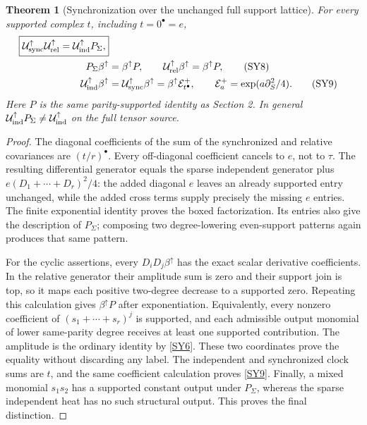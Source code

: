 \documentclass[11pt,a4paper]{article}
\newtheorem{theorem}{Theorem}[section]
\theoremstyle{definition}\newtheorem{definition}[theorem]{Definition}
\begin{document}
\begin{theorem}[Synchronization over the unchanged full support lattice]
For every supported complex $t$, including $t=0^\bullet=e$,
\begin{align}
 \boxed{\mathcal U_{\rm sync}^{\uparrow}
            \mathcal U_{\rm rel}^{\uparrow}
        =\mathcal U_{\rm ind}^{\uparrow}P_\Sigma,}\notag\\
 P_\Sigma\beta^\uparrow&=\beta^\uparrow P,\qquad
 \mathcal U_{\rm rel}^{\uparrow}\beta^\uparrow=\beta^\uparrow P,
                                                               \tag{SY8}\label{SY8}\\
 \mathcal U_{\rm ind}^{\uparrow}\beta^\uparrow
 &=\mathcal U_{\rm sync}^{\uparrow}\beta^\uparrow
 =\beta^\uparrow\mathcal E^+_{t^\bullet},
 \qquad \mathcal E^+_a=\exp(a\partial_S^2/4).                 \tag{SY9}\label{SY9}
\end{align}
Here $P$ is the same parity-supported identity as Section 2. In general
$\mathcal U_{\rm ind}^{\uparrow}P_\Sigma\ne
\mathcal U_{\rm ind}^{\uparrow}$ on the full tensor source.
\end{theorem}
\begin{proof}
The diagonal coefficients of the sum of the synchronized and relative covariances are $(t/r)^\bullet$. Every off-diagonal coefficient cancels to $e$, not to $\tau$. The resulting differential generator equals the sparse independent generator plus $e(D_1+\cdots+D_r)^2/4$: the added diagonal $e$ leaves an already supported entry unchanged, while the added cross terms supply precisely the missing $e$ entries. The finite exponential identity proves the boxed factorization. Its entries also give the description of $P_\Sigma$; composing two degree-lowering even-support patterns again produces that same pattern.

For the cyclic assertions, every $D_iD_j\beta^\uparrow$ has the exact scalar derivative coefficients. In the relative generator their amplitude sum is zero and their support join is top, so it maps each positive two-degree decrease to a supported zero. Repeating this calculation gives $\beta^\uparrow P$ after exponentiation. Equivalently, every nonzero coefficient of $(s_1+\cdots+s_r)^j$ is supported, and each admissible output monomial of lower same-parity degree receives at least one supported contribution. The amplitude is the ordinary identity by \eqref{SY6}. These two coordinates prove the equality without discarding any label. The independent and synchronized clock sums are $t$, and the same coefficient calculation proves \eqref{SY9}. Finally, a mixed monomial $s_1s_2$ has a supported constant output under $P_\Sigma$, whereas the sparse independent heat has no such structural output. This proves the final distinction.
\end{proof}
\end{document}
